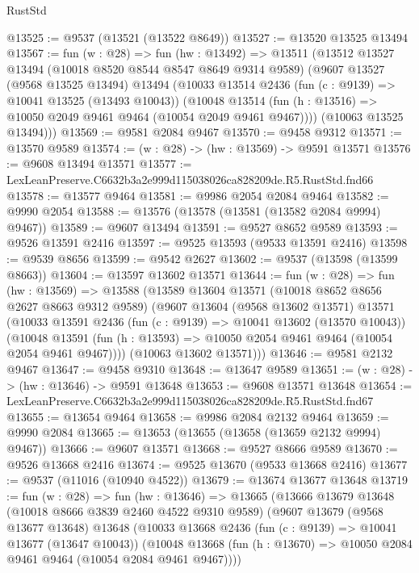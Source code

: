 \begin{lexlean}{RustStd}
\begin{coremodule}
@13525 := @9537 (@13521 (@13522 @8649))
@13527 := @13520 @13525 @13494
@13567 := fun (w : @28) =>
  fun (hw : @13492) =>
  @13511
    (@13512
      @13527
      @13494
      (@10018 @8520 @8544 @8547 @8649 @9314 @9589)
      (@9607
        @13527
        (@9568 @13525 @13494)
        @13494
        (@10033
          @13514
          @2436
          (fun (c : @9139) => @10041 @13525 (@13493 @10043))
          (@10048 @13514 (fun (h : @13516) => @10050 @2049 @9461 @9464 (@10054 @2049 @9461 @9467))))
        (@10063 @13525 @13494)))
@13569 := @9581 @2084 @9467
@13570 := @9458 @9312
@13571 := @13570 @9589
@13574 := (w : @28) -> (hw : @13569) -> @9591 @13571
@13576 := @9608 @13494 @13571
@13577 := LexLeanPreserve.C6632b3a2e999d115038026ca828209de.R5.RustStd.fnd66
@13578 := @13577 @9464
@13581 := @9986 @2054 @2084 @9464
@13582 := @9990 @2054
@13588 := @13576 (@13578 (@13581 (@13582 @2084 @9994) @9467))
@13589 := @9607 @13494
@13591 := @9527 @8652 @9589
@13593 := @9526 @13591 @2416
@13597 := @9525 @13593 (@9533 @13591 @2416)
@13598 := @9539 @8656
@13599 := @9542 @2627
@13602 := @9537 (@13598 (@13599 @8663))
@13604 := @13597 @13602 @13571
@13644 := fun (w : @28) =>
  fun (hw : @13569) =>
  @13588
    (@13589
      @13604
      @13571
      (@10018 @8652 @8656 @2627 @8663 @9312 @9589)
      (@9607
        @13604
        (@9568 @13602 @13571)
        @13571
        (@10033
          @13591
          @2436
          (fun (c : @9139) => @10041 @13602 (@13570 @10043))
          (@10048 @13591 (fun (h : @13593) => @10050 @2054 @9461 @9464 (@10054 @2054 @9461 @9467))))
        (@10063 @13602 @13571)))
@13646 := @9581 @2132 @9467
@13647 := @9458 @9310
@13648 := @13647 @9589
@13651 := (w : @28) -> (hw : @13646) -> @9591 @13648
@13653 := @9608 @13571 @13648
@13654 := LexLeanPreserve.C6632b3a2e999d115038026ca828209de.R5.RustStd.fnd67
@13655 := @13654 @9464
@13658 := @9986 @2084 @2132 @9464
@13659 := @9990 @2084
@13665 := @13653 (@13655 (@13658 (@13659 @2132 @9994) @9467))
@13666 := @9607 @13571
@13668 := @9527 @8666 @9589
@13670 := @9526 @13668 @2416
@13674 := @9525 @13670 (@9533 @13668 @2416)
@13677 := @9537 (@11016 (@10940 @4522))
@13679 := @13674 @13677 @13648
@13719 := fun (w : @28) =>
  fun (hw : @13646) =>
  @13665
    (@13666
      @13679
      @13648
      (@10018 @8666 @3839 @2460 @4522 @9310 @9589)
      (@9607
        @13679
        (@9568 @13677 @13648)
        @13648
        (@10033
          @13668
          @2436
          (fun (c : @9139) => @10041 @13677 (@13647 @10043))
          (@10048 @13668 (fun (h : @13670) => @10050 @2084 @9461 @9464 (@10054 @2084 @9461 @9467))))

\end{coremodule}
\end{lexlean}
